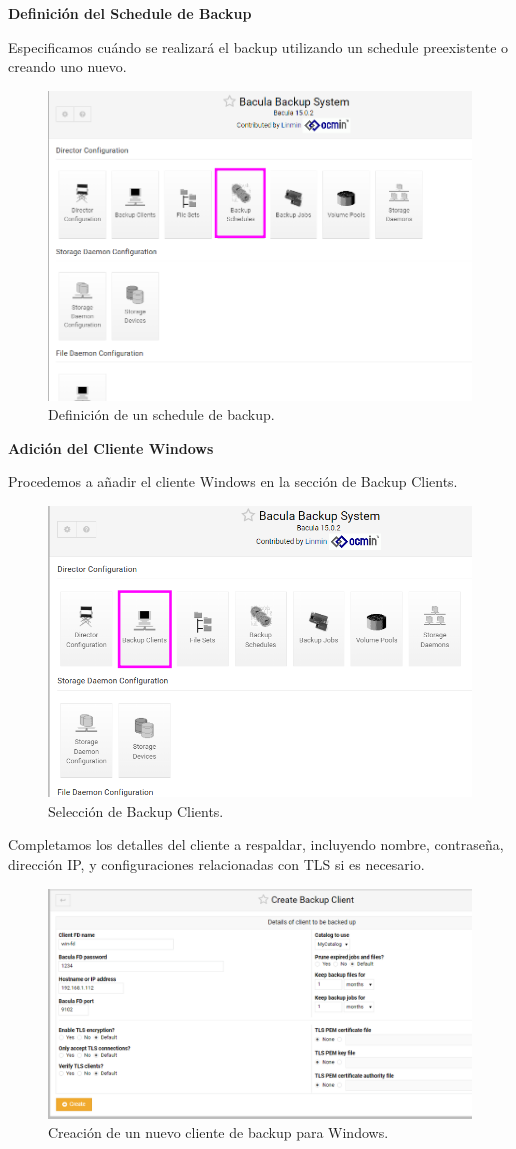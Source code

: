 \textbf{Definición del Schedule de Backup}

Especificamos cuándo se realizará el backup utilizando un schedule preexistente o creando uno nuevo.

\begin{figure}[H]
    \centering
    \includegraphics[width=0.5\linewidth]{instalacionBacula/schedule.png}
    \caption{Definición de un schedule de backup.}
\end{figure}

\textbf{Adición del Cliente Windows}

Procedemos a añadir el cliente Windows en la sección de Backup Clients.

\begin{figure}[H]
    \centering
    \includegraphics[width=0.5\linewidth]{instalacionBacula/asdasdas.png}
    \caption{Selección de Backup Clients.}
\end{figure}

Completamos los detalles del cliente a respaldar, incluyendo nombre, contraseña, dirección IP, y configuraciones relacionadas con TLS si es necesario.

\begin{figure}[H]
    \centering
    \includegraphics[width=0.5\linewidth]{instalacionBacula/createbackupclientwindows.png}
    \caption{Creación de un nuevo cliente de backup para Windows.}
\end{figure}

